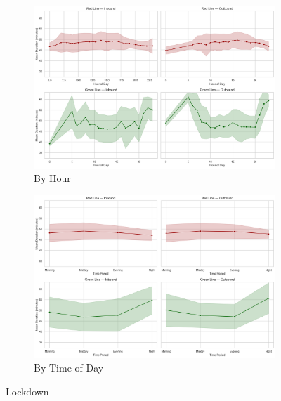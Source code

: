 \begin{figure}[H]
  \centering
  \begin{subfigure}[t]{0.49\textwidth}
    \centering
    \includegraphics[width=\textwidth]{figures/appendix_figures/journey_duration/duration_hourly_combined_lockdown.png}
    \caption*{By Hour}
  \end{subfigure}
  \hfill
  \begin{subfigure}[t]{0.49\textwidth}
    \centering
    \includegraphics[width=\textwidth]{figures/appendix_figures/journey_duration/duration_period_combined_lockdown.png}
    \caption*{By Time-of-Day}
  \end{subfigure}
  \caption{Lockdown}
\end{figure}

